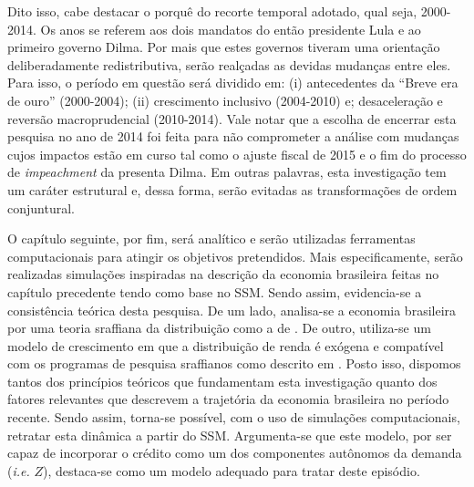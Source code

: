 Dito isso, cabe destacar o porquê do recorte temporal adotado, qual seja, 2000-2014. Os anos se referem aos dois mandatos do então presidente Lula e ao primeiro governo Dilma. Por mais que estes governos tiveram uma orientação deliberadamente redistributiva, serão realçadas as devidas mudanças entre eles. Para isso, o período em questão será dividido em: (i) antecedentes da ``Breve era de ouro'' (2000-2004); (ii) crescimento inclusivo (2004-2010) e; desaceleração e reversão macroprudencial  (2010-2014).
Vale notar que a escolha de encerrar esta pesquisa no ano de 2014 foi feita para não comprometer a análise com mudanças cujos impactos estão em curso tal como o ajuste fiscal de 2015 e o fim do processo de \textit{impeachment} da presenta Dilma. 
Em outras palavras, esta investigação tem um caráter estrutural e, dessa forma, serão evitadas as transformações de ordem conjuntural. 







O capítulo seguinte, por fim, será analítico e serão utilizadas ferramentas computacionais para atingir os objetivos pretendidos. Mais especificamente, serão realizadas simulações inspiradas na descrição da economia brasileira feitas no capítulo precedente tendo como base no SSM. 
Sendo assim, evidencia-se a consistência teórica desta pesquisa. De um lado, analisa-se a economia brasileira por uma teoria sraffiana da distribuição como a de \textcite{pivetti_essay_1992}. De outro, utiliza-se um modelo de crescimento em que a distribuição de renda é exógena e compatível com os programas de pesquisa sraffianos como descrito em \textcite{aspromourgos_sraffian_2004}. Posto isso, dispomos tantos dos princípios teóricos que fundamentam esta investigação quanto dos fatores relevantes que descrevem a trajetória da economia brasileira no período recente. Sendo assim, torna-se possível, com o uso de simulações computacionais, retratar esta dinâmica a partir do SSM.  Argumenta-se que este modelo, por ser capaz de incorporar o crédito como um dos componentes autônomos da demanda (\textit{i.e.} $Z$), destaca-se como um modelo adequado para tratar deste episódio.

